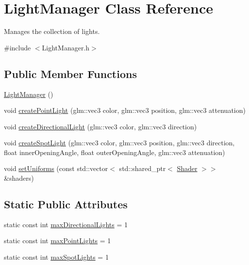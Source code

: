 \hypertarget{class_light_manager}{}\section{Light\+Manager Class Reference}
\label{class_light_manager}


Manages the collection of lights.  




{\ttfamily \#include $<$Light\+Manager.\+h$>$}

\subsection*{Public Member Functions}
\begin{DoxyCompactItemize}
\item 
\mbox{\hyperlink{class_light_manager_a1eee8eb276ec7f041d961a567389754a}{Light\+Manager}} ()
\item 
void \mbox{\hyperlink{class_light_manager_ae0f5b4100720ed12a23e32ffe7de9d3a}{create\+Point\+Light}} (glm\+::vec3 color, glm\+::vec3 position, glm\+::vec3 attenuation)
\item 
void \mbox{\hyperlink{class_light_manager_a4c9bb6347e3d2ef437a5b8ad8cba86d2}{create\+Directional\+Light}} (glm\+::vec3 color, glm\+::vec3 direction)
\item 
void \mbox{\hyperlink{class_light_manager_a35f0a1eacd4e6666173651fd96d2b5e6}{create\+Spot\+Light}} (glm\+::vec3 color, glm\+::vec3 position, glm\+::vec3 direction, float inner\+Opening\+Angle, float outer\+Opening\+Angle, glm\+::vec3 attenuation)
\item 
void \mbox{\hyperlink{class_light_manager_af81f79c0cff819a9d3bd1a36253aa5cb}{set\+Uniforms}} (const std\+::vector$<$ std\+::shared\+\_\+ptr$<$ \mbox{\hyperlink{class_shader}{Shader}} $>$$>$ \&shaders)
\end{DoxyCompactItemize}
\subsection*{Static Public Attributes}
\begin{DoxyCompactItemize}
\item 
static const int \mbox{\hyperlink{class_light_manager_a86c2dd9645783cfa9051eba87afbf11c}{max\+Directional\+Lights}} = 1
\item 
static const int \mbox{\hyperlink{class_light_manager_a9144bde2784500d384280660de2460ae}{max\+Point\+Lights}} = 1
\item 
static const int \mbox{\hyperlink{class_light_manager_ab805ba7944bb72374cd02bbae19dfd08}{max\+Spot\+Lights}} = 1
\end{DoxyCompactItemize}


